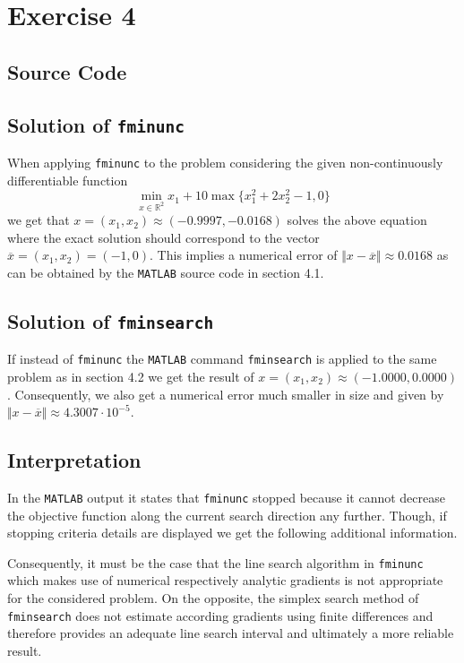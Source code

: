 \documentclass{article}
\begin{document}
	\section{Exercise 4}
	\subsection{Source Code}
	
	
	\subsection{Solution of \texttt{fminunc}}
	When applying \texttt{fminunc} to the problem considering the given non-continuously differentiable function 
	\begin{equation*}
		\min_{x\in\mathbb{R}^2}x_1+10\max\{x_1^2+2x_2^2-1,0\}
	\end{equation*}
	we get that $x=(x_1,x_2)\approx(-0.9997,-0.0168)$ solves the above equation where the exact solution should correspond to the vector $\overline{x}=(x_1,x_2)=(-1,0)$. This implies a numerical error of $\Vert x - \overline{x}\Vert \approx 0.0168$ as can be obtained by the \texttt{MATLAB} source code in section 4.1.
	\subsection{Solution of \texttt{fminsearch}}
	If instead of \texttt{fminunc} the \texttt{MATLAB} command \texttt{fminsearch} is applied to the same problem as in section 4.2 we get the result of $x=(x_1,x_2)\approx(-1.0000,0.0000)$. Consequently, we also get a numerical error much smaller in size and given by $\Vert x - \overline{x}\Vert \approx 4.3007\cdot 10^{-5}$.
	\subsection{Interpretation}
	In the \texttt{MATLAB} output it states that \texttt{fminunc} stopped because it cannot decrease the objective function along the current search direction any further. Though, if stopping criteria details are displayed we get the following additional information.
	
	Consequently, it must be the case that the line search algorithm in \texttt{fminunc} which makes use of numerical respectively analytic gradients is not appropriate for the considered problem. On the opposite, the simplex search method of \texttt{fminsearch} does not estimate according gradients using finite differences and therefore provides an adequate line search interval and ultimately a more reliable result. 
\end{document}
